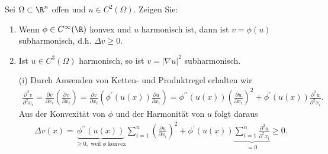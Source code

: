
\begin{exercise}

Sei $\Omega \subset \R^n$ offen und $u \in C^2(\Omega)$.
Zeigen Sie:

\begin{enumerate}[label = (\roman*)]
    \item Wenn $\phi \in C^\infty(\R)$ konvex und $u$ harmonisch ist, dann ist $v = \phi(u)$ subharmonisch, d.h. $\Delta v \geq 0$.
    \item Ist $u \in C^3(\Omega)$ harmonisch, so ist $v = |\nabla u|^2$ subharmonisch.
\end{enumerate}

\end{exercise}



\begin{solution}
  \begin{itemize}

  \item[(i)] Durch Anwenden von Ketten- und Produktregel erhalten wir
  \begin{align}
      \frac{\partial^2 v}{\partial^2 x_i} = \frac{\partial v}{\partial x_i} \left(\frac{\partial v}{\partial x_i}\right) = \frac{\partial v}{\partial x_i} \left(\phi^\prime(u(x)) \frac{\partial u}{\partial x_i}\right) = \phi^{\prime\prime}(u(x)) \left(\frac{\partial u}{\partial x_i}\right)^2 + \phi^\prime(u(x)) \frac{\partial^2 u}{\partial^2 x_i}.
  \end{align}
  Aus der Konvexität von $\phi$ und der Harmonität von $u$ folgt daraus
  \begin{align}
      \Delta v(x) = \underbrace{\phi^{\prime\prime}(u(x))}_{\geq 0, \text{~weil $\phi$ konvex}} \sum_{i=1}^n \left(\frac{\partial u}{\partial x_i}\right)^2 + \phi^\prime(u(x)) \underbrace{\sum_{i=1}^n \frac{\partial^2 u}{\partial^2 x_i}}_{= 0} \geq 0.
  \end{align}
  \end{itemize}

\end{solution}

